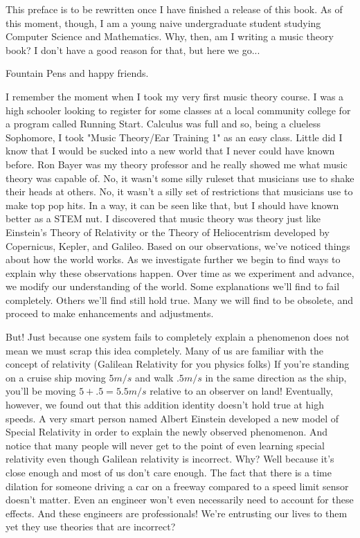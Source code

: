 \documentclass[../OpenAppliedMusicTheory.tex]{subfiles}
\begin{document}
    

    This preface is to be rewritten once I have finished a release of this book. As of this moment, though, I am a young naive undergraduate student studying Computer Science and Mathematics. Why, then, am I writing a music theory book? I don't have a good reason for that, but here we go...

    Fountain Pens and happy friends. 

    I remember the moment when I took my very first music theory course. I was a high schooler looking to register for some classes at a local community college for a program called Running Start. Calculus was full and so, being a clueless Sophomore, I took "Music Theory/Ear Training 1" as an easy class. Little did I know that I would be sucked into a new world that I never could have known before. Ron Bayer was my theory professor and he really showed me what music theory was capable of. No, it wasn't some silly ruleset that musicians use to shake their heads at others. No, it wasn't a silly set of restrictions that musicians use to make top pop hits. In a way, it can be seen like that, but I should have known better as a STEM nut. I discovered that music theory was theory just like Einstein's Theory of Relativity or the Theory of Heliocentrism developed by Copernicus, Kepler, and Galileo. Based on our observations, we've noticed things about how the world works. As we investigate further we begin to find ways to explain why these observations happen. Over time as we experiment and advance, we modify our understanding of the world. Some explanations we'll find to fail completely. Others we'll find still hold true. Many we will find to be obsolete, and proceed to make enhancements and adjustments. 

    But! Just because one system fails to completely explain a phenomenon does not mean we must scrap this idea completely. Many of us are familiar with the concept of relativity (Galilean Relativity for you physics folks) If you're standing on a cruise ship moving $5m/s$ and walk $.5m/s$ in the same direction as the ship, you'll be moving $5+.5=5.5m/s$ relative to an observer on land! Eventually, however, we found out that this addition identity doesn't hold true at high speeds. A very smart person named Albert Einstein developed a new model of Special Relativity in order to explain the newly observed phenomenon. And notice that many people will never get to the point of even learning special relativity even though Galilean relativity is incorrect. Why? Well because it's close enough and most of us don't care enough. The fact that there is a time dilation for someone driving a car on a freeway compared to a speed limit sensor doesn't matter. Even an engineer won't even necessarily need to account for these effects. And these engineers are professionals! We're entrusting our lives to them yet they use theories that are incorrect?
\end{document}
